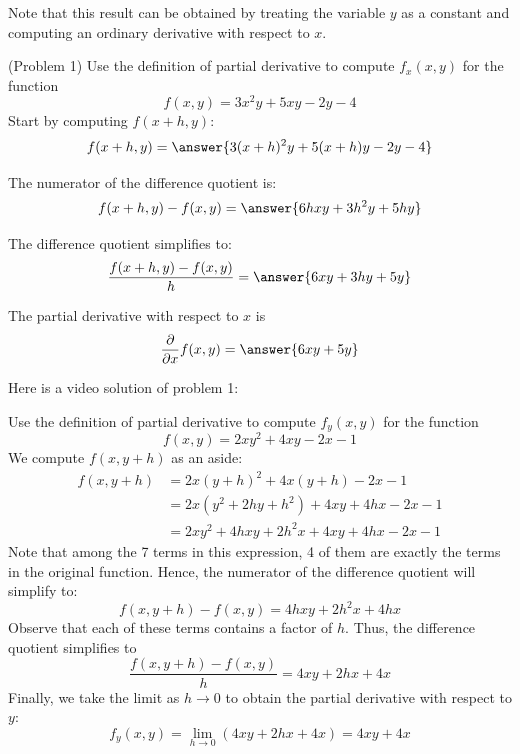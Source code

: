 \documentclass[handout]{ximera}
\begin{document}
\begin{remark}
Note that this result can be obtained by treating the variable $y$ as a 
constant and computing an ordinary derivative with respect to $x$.
\end{remark}

\begin{problem}(Problem 1)
Use the definition of partial derivative to compute $f_x(x,y)$ for the function
\[
f(x,y) = 3x^2y + 5xy - 2y - 4
\]
Start by computing $f(x+h, y)$:
\[
f(x+h, y) = \answer{3(x+h)^2y + 5(x+h)y - 2y - 4}
\]

The numerator of the difference quotient is:
\[
f(x+h,y) - f(x,y) = \answer{6hxy + 3h^2y + 5hy}
\]

The difference quotient simplifies to:
\[
\frac{f(x+h,y) - f(x,y)}{h} = \answer{6xy + 3hy + 5y}
\]


The partial derivative with respect to $x$ is
\[
\frac{\partial}{\partial x} f(x,y) = \answer{6xy + 5y}
\]

\end{problem}

Here is a video solution of problem 1:\\
\begin{foldable}
\end{foldable}


\begin{example}[Example 2]
Use the definition of partial derivative to compute $f_y(x,y)$ for the function
\[
f(x,y) = 2xy^2 + 4xy - 2x -1
\]
We compute $f(x, y+h)$ as an aside:
\begin{align*}
f(x, y+h) &= 2x(y+h)^2 + 4x(y+h) - 2x  -1\\
          &= 2x(y^2 + 2hy + h^2) + 4xy + 4hx - 2x - 1\\
          &= 2xy^2 + 4hxy + 2h^2x + 4xy + 4hx - 2x - 1
\end{align*}
Note that among the 7 terms in this expression, 4 of them are exactly the 
terms in the original function.
Hence, the numerator of the difference quotient will simplify to:
\[
f(x, y+h) - f(x,y) =  4hxy + 2h^2x  + 4hx
\]
Observe that each of these terms contains a factor of $h$. 
Thus, the difference quotient simplifies to
\[
\frac{f(x, y+h) -f(x, y)}{h} = 4xy + 2hx +4x
\]
Finally, we take the limit as $h \to 0$ to obtain the partial 
derivative with respect to $y$:
\[
f_y(x,y) = \lim_{h \to 0} \left(4xy + 2hx +4x\right) = 4xy + 4x
\]

\end{example}
\end{document}
